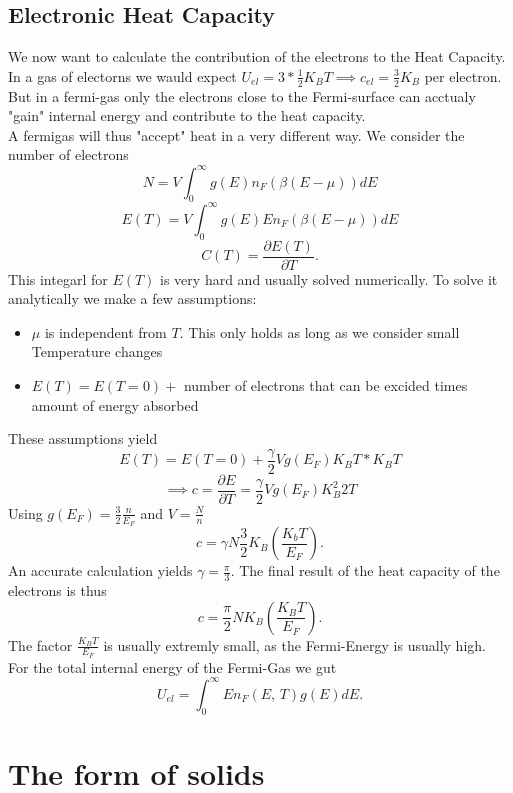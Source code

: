 \documentclass{report}
\begin{document}
\section{Electronic Heat Capacity}
We now want to calculate the contribution of the electrons to the Heat Capacity. In a gas of electorns we wauld expect $U_{el} = 3 * \frac{1}{2} K_B T \implies c_{el} = \frac{3}{2}K_B$ per electron. But in a fermi-gas only the electrons close to the Fermi-surface can acctualy "gain" internal energy and contribute to the heat capacity. \\
A fermigas will thus "accept" heat in a very different way. We consider the number of electrons \[
	N = V \int_0^{\infty} g(E) n_F\left( \beta\left( E - \mu \right)  \right) dE
\] \[
E(T) = V \int_0^{\infty} g(E) E n_F\left( \beta \left( E - \mu \right)  \right) dE
\] \[
C(T) = \frac{\partial E(T)}{\partial T}
.\] This integarl for $E(T)$ is very hard and usually solved numerically. To solve it analytically we make a few assumptions:
\begin{itemize}
	\item $\mu$ is independent from $T$. This only holds as long as we consider small Temperature changes
	\item $E(T) = E(T=0) + $ number of electrons that can be excided times amount of energy absorbed
\end{itemize}These assumptions yield \[
E(T) = E(T=0) + \frac{\gamma}{2}V g(E_F) K_B T * K_B T
\] \[
\implies c = \frac{\partial E}{\partial T} = \frac{\gamma}{2}V g(E_F) K_B^2 2 T
\] Using $g(E_F) = \frac{3}{2} \frac{n}{E_F}$ and $V = \frac{N}{n}$ \[
c = \gamma N \frac{3}{2} K_B \left( \frac{K_b T}{E_F} \right) 
.\] An accurate calculation yields $\gamma = \frac{\pi}{3}$. The final result of the heat capacity of the electrons is thus \[
c = \frac{\pi}{2} N K_B \left( \frac{K_B T}{E_F} \right) 
.\] The factor $\frac{K_B T}{E_F}$ is usually extremly small, as the Fermi-Energy is usually high. \\
For the total internal energy of the Fermi-Gas we gut \[
	U_{el} = \int_0^{\infty} E n_F\left( E\text{, }T \right) g(E) dE
.\] 

\chapter{The form of solids}
\end{document}
